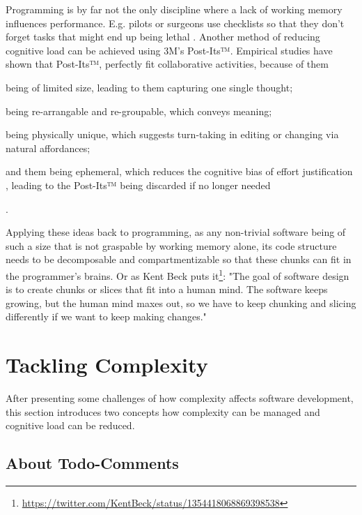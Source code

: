 Programming is by far not the only discipline where a lack of working memory influences performance.
E.g. pilots or surgeons use checklists so that they don't forget tasks that might end up being lethal \cite{seemann_code_2021}.
Another method of reducing cognitive load can be achieved using 3M's Post-Its™.
Empirical studies \cite{digiano_learning_nodate, dove_grouping_2018} have shown that Post-Its™, perfectly fit collaborative activities, because of them
\begin{enumerate*}[label=(\roman*)]
\item being of limited size, leading to them capturing one single thought;
\item being re-arrangable and re-groupable, which conveys meaning;
\item being physically unique, which suggests turn-taking in editing or changing via natural affordances;
\item and them being ephemeral, which reduces the cognitive bias of effort justification \cite{norton_ikea_2012}, leading to the Post-Its™ being discarded if no longer needed
\end{enumerate*}.

Applying these ideas back to programming, as any non-trivial software being of such a size that is not graspable by working memory alone, its code structure needs to be decomposable and compartmentizable so that these chunks can fit in the programmer's brains.
Or as Kent Beck puts it\footnote{\url{https://twitter.com/KentBeck/status/1354418068869398538}}: "The goal of software design is to create chunks or slices that fit into a human mind. The software keeps growing, but the human mind maxes out, so we have to keep chunking and slicing differently if we want to keep making changes."



\section{Tackling Complexity}
\label{sec:tackling-complexity}
After presenting some challenges of how complexity affects software development, this section introduces two concepts how complexity can be managed and cognitive load can be reduced.



\subsection{About Todo-Comments}
\label{sec:introduction-about-todo-comments}

